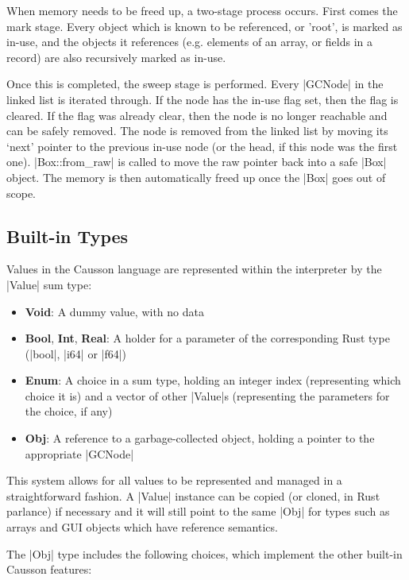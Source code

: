\documentclass[11pt]{report}
\begin{document}
When memory needs to be freed up, a two-stage process occurs. First comes the mark stage. Every object which is known to be referenced, or 'root', is marked as in-use, and the objects it references (e.g. elements of an array, or fields in a record) are also recursively marked as in-use.

Once this is completed, the sweep stage is performed. Every |GCNode| in the linked list is iterated through. If the node has the in-use flag set, then the flag is cleared. If the flag was already clear, then the node is no longer reachable and can be safely removed. The node is removed from the linked list by moving its `next' pointer to the previous in-use node (or the head, if this node was the first one). |Box::from_raw| is called to move the raw pointer back into a safe |Box| object. The memory is then automatically freed up once the |Box| goes out of scope.

\subsection{Built-in Types}

Values in the Causson language are represented within the interpreter by the |Value| sum type:

\begin{itemize}[nosep, topsep=0pt]
    \item \textbf{Void}: A dummy value, with no data

    \item \textbf{Bool}, \textbf{Int}, \textbf{Real}: A holder for a parameter of the corresponding Rust type (|bool|, |i64| or |f64|)

    \item \textbf{Enum}: A choice in a sum type, holding an integer index (representing which choice it is) and a vector of other |Value|s (representing the parameters for the choice, if any)

    \item \textbf{Obj}: A reference to a garbage-collected object, holding a pointer to the appropriate |GCNode|
\end{itemize}

This system allows for all values to be represented and managed in a straightforward fashion. A |Value| instance can be copied (or cloned, in Rust parlance) if necessary and it will still point to the same |Obj| for types such as arrays and GUI objects which have reference semantics.

The |Obj| type includes the following choices, which implement the other built-in Causson features:
\end{document}
